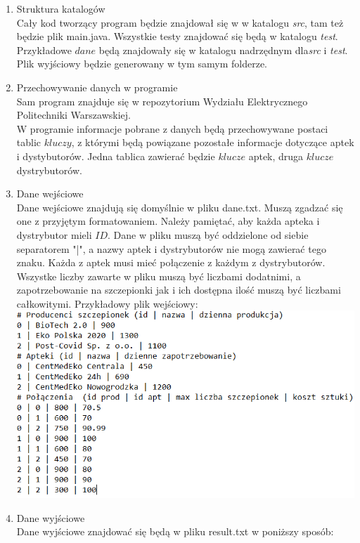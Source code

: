 \documentclass[11pt]{article}
\begin{document}
\begin{enumerate}
\begin{enumerate}[label=\arabic{enumi}.\arabic*.]
 \item Struktura katalogów\\
Cały kod tworzący program będzie znajdował się w w katalogu \textsl{src}, tam też będzie plik main.java. Wszystkie testy znajdować się będą w katalogu \textsl{test}. Przykładowe $dane$ będą znajdowały się w katalogu nadrzędnym dla\textsl{src} i \textsl{test}. Plik wyjściowy będzie generowany w tym samym folderze. 
\item Przechowywanie danych w programie \\
Sam program znajduje się w repozytorium Wydziału Elektrycznego Politechniki Warszawskiej.\\
W programie informacje pobrane z danych będą przechowywane postaci tablic $kluczy$, z którymi będą powiązane pozostałe informacje dotyczące aptek i dystybutorów. Jedna tablica zawierać będzie $klucze$ aptek, druga $klucze$ dystrybutorów. 
\item Dane wejściowe \\
Dane wejściowe znajdują się domyślnie w pliku dane.txt. Muszą zgadzać się one z przyjętym formatowaniem. Należy pamiętać, aby każda apteka i dystrybutor mieli $ID$. Dane w pliku muszą być oddzielone od siebie separatorem "|", a nazwy aptek i dystrybutorów nie mogą zawierać tego znaku. Każda z aptek musi mieć połączenie z każdym z dystrybutorów. Wszystke liczby zawarte w pliku muszą być liczbami dodatnimi, a zapotrzebowanie na szczepionki jak i ich dostępna ilość muszą być liczbami całkowitymi. Przykładowy plik wejściowy:\\

\includegraphics {in.png}

\item Dane wyjściowe\\
Dane wyjściowe znajdować się będą w pliku result.txt w poniższy sposób:


\end{enumerate}
\end{enumerate}
\end{document}
